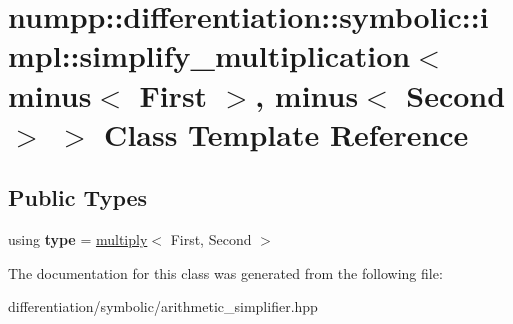 \hypertarget{classnumpp_1_1differentiation_1_1symbolic_1_1impl_1_1simplify__multiplication_3_01minus_3_01Firsc21300ab659abf99cc3eaf6c7230201c}{}\section{numpp\+:\+:differentiation\+:\+:symbolic\+:\+:impl\+:\+:simplify\+\_\+multiplication$<$ minus$<$ First $>$, minus$<$ Second $>$ $>$ Class Template Reference}
\label{classnumpp_1_1differentiation_1_1symbolic_1_1impl_1_1simplify__multiplication_3_01minus_3_01Firsc21300ab659abf99cc3eaf6c7230201c}
\subsection*{Public Types}
\begin{DoxyCompactItemize}
\item 
\mbox{\label{classnumpp_1_1differentiation_1_1symbolic_1_1impl_1_1simplify__multiplication_3_01minus_3_01Firsc21300ab659abf99cc3eaf6c7230201c_a9479ac0c3b5c5533eed5226ea9ac52cd}} 
using {\bfseries type} = \hyperlink{classnumpp_1_1differentiation_1_1symbolic_1_1multiply}{multiply}$<$ First, Second $>$
\end{DoxyCompactItemize}


The documentation for this class was generated from the following file\+:\begin{DoxyCompactItemize}
\item 
differentiation/symbolic/arithmetic\+\_\+simplifier.\+hpp\end{DoxyCompactItemize}
